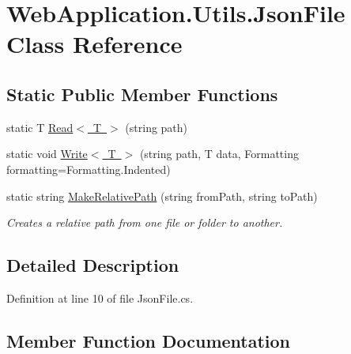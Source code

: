 \hypertarget{classWebApplication_1_1Utils_1_1JsonFile}{}\section{Web\+Application.\+Utils.\+Json\+File Class Reference}
\label{classWebApplication_1_1Utils_1_1JsonFile}
\subsection*{Static Public Member Functions}
\begin{DoxyCompactItemize}
\item 
static T \mbox{\hyperlink{classWebApplication_1_1Utils_1_1JsonFile_ad12499fbe23e98055245db058a876188}{Read$<$ T $>$}} (string path)
\item 
static void \mbox{\hyperlink{classWebApplication_1_1Utils_1_1JsonFile_a2d4f23a606776d2a8d5f40a0532ab25b}{Write$<$ T $>$}} (string path, T data, Formatting formatting=Formatting.\+Indented)
\item 
static string \mbox{\hyperlink{classWebApplication_1_1Utils_1_1JsonFile_ada241df4ee189bf1884e4e71ba6e7aeb}{Make\+Relative\+Path}} (string from\+Path, string to\+Path)
\begin{DoxyCompactList}\small\item\em Creates a relative path from one file or folder to another. \end{DoxyCompactList}\end{DoxyCompactItemize}


\subsection{Detailed Description}


Definition at line 10 of file Json\+File.\+cs.



\subsection{Member Function Documentation}
\mbox{\label{classWebApplication_1_1Utils_1_1JsonFile_ada241df4ee189bf1884e4e71ba6e7aeb}} 
